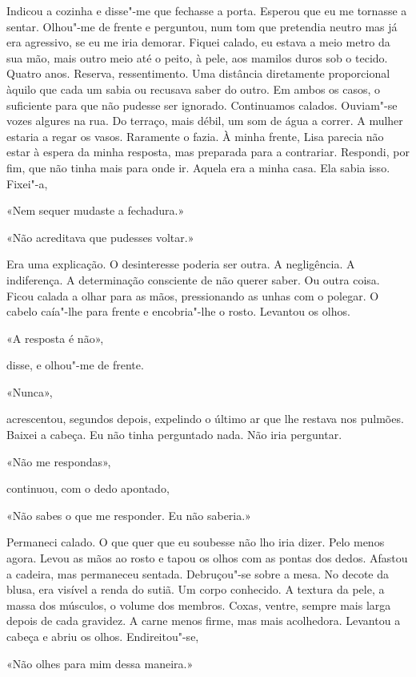 Indicou a cozinha e disse"-me que fechasse a porta. Esperou que eu me
tornasse a sentar. Olhou"-me de frente e perguntou, num tom que
pretendia neutro mas já era agressivo, se eu me iria demorar. Fiquei
calado, eu estava a meio metro da sua mão, mais outro meio até o peito,
à pele, aos mamilos duros sob o tecido. Quatro anos. Reserva,
ressentimento. Uma distância diretamente proporcional àquilo que cada
um sabia ou recusava saber do outro. Em ambos os casos, o suficiente
para que não pudesse ser ignorado. Continuamos calados. Ouviam"-se vozes
algures na rua. Do terraço, mais débil, um som de água a correr. A
mulher estaria a regar os vasos. Raramente o fazia. À minha frente, Lisa
parecia não estar à espera da minha resposta, mas preparada para a
contrariar. Respondi, por fim, que não tinha mais para onde ir. Aquela
era a minha casa. Ela sabia isso. Fixei"-a,

«Nem sequer mudaste a fechadura.»

«Não acreditava que pudesses voltar.»

Era uma explicação. O desinteresse poderia ser outra. A negligência. A
indiferença. A determinação consciente de não querer saber. Ou outra
coisa. Ficou calada a olhar para as mãos, pressionando as unhas com o
polegar. O cabelo caía"-lhe para frente e encobria"-lhe o rosto.
Levantou os olhos.

«A resposta é não»,

disse, e olhou"-me de frente.

«Nunca»,

acrescentou, segundos depois, expelindo o último ar que lhe restava nos
pulmões. Baixei a cabeça. Eu não tinha perguntado nada. Não iria
perguntar.

«Não me respondas»,

continuou, com o dedo apontado,

«Não sabes o que me responder. Eu não saberia.»

Permaneci calado. O que quer que eu soubesse não lho iria dizer. Pelo
menos agora. Levou as mãos ao rosto e tapou os olhos com as pontas dos
dedos. Afastou a cadeira, mas permaneceu sentada. Debruçou"-se sobre a
mesa. No decote da blusa, era visível a renda do sutiã. Um corpo
conhecido. A textura da pele, a massa dos músculos, o volume dos
membros. Coxas, ventre, sempre mais larga depois de cada gravidez. A
carne menos firme, mas mais acolhedora. Levantou a cabeça e abriu os
olhos. Endireitou"-se,

«Não olhes para mim dessa maneira.»

